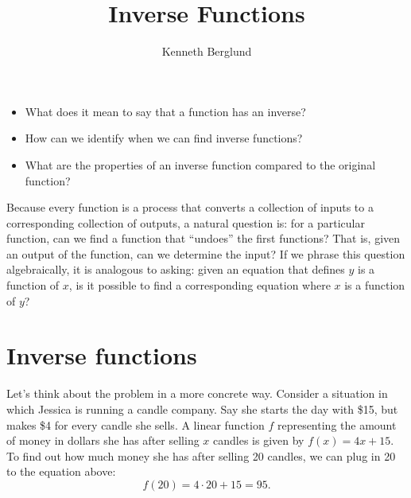 \documentclass[nooutcomes]{ximera}
\author{Kenneth Berglund}
\title{Inverse Functions}
\begin{document}
\licenseAPCSZ
\begin{abstract}
  
\end{abstract}
\maketitle



\begin{motivatingQuestions}\begin{itemize}
\item What does it mean to say that a function has an inverse? 
\item How can we identify when we can find inverse functions?
\item What are the properties of an inverse function compared to the original function?
\end{itemize}\end{motivatingQuestions}



Because every function is a process that converts a collection of inputs to a corresponding collection of outputs, a natural question is: for a particular function, can we find a function that ``undoes'' the first functions? That is, given an output of the function, can we determine the input? If we phrase this question algebraically, it is analogous to asking: given an equation that defines $y$ is a function of $x$, is it possible to find a corresponding equation where $x$ is a function of $y$?



\section{Inverse functions}
Let's think about the problem in a more concrete way. Consider a situation in which Jessica is running a candle company. Say she starts the day with \$15, but makes \$4 for every candle she sells. A linear function $f$ representing the amount of money in dollars she has after selling $x$ candles is given by $f(x) = 4x + 15$. To find out how much money she has after selling 20 candles, we can plug in 20 to the equation above:
$$
f(20) = 4\cdot 20 + 15 = 95.
$$
\end{document}
